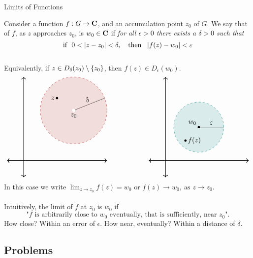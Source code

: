 \vspace*{2em}

\begin{mdframed}
\begin{center}
{\Large Limits of Functions}
\end{center}
\end{mdframed}

\begin{definition}\label{limdef}
Consider a function $f:G \to \mathbf C$, and an accumulation point $z_0$ of $G$. We say that  of $f$, as $z$ approaches $z_0$, is $w_0 \in \mathbf C$ if \emph{for all $\epsilon > 0$ there exists a $\delta > 0$ such that
\[\text{if }\ 0 < \left\lvert z - z_0\right\rvert < \delta,\quad \text{then }\ \left\lvert f(z) - w_0\right\rvert<\varepsilon\]}\\
Equivalently, if $z \in D_{\delta}(z_0)\setminus \left\{z_0\right\}$, then $f(z) \in D_\epsilon(w_0)$.
\newpage
\[\begin{tikzpicture}[scale=0.85]
    \draw[<->,thick] (-1,0)--(5,0);
	\draw[<->,thick] (0,-1)--(0,5);
	\filldraw[firebrick,fill opacity=1/7,dashed](3,3) circle (2);
    \draw[firebrick,dotted](3,3) circle (3pt);    
    \draw[](3,3)--(4.86,3.735) node[sloped,midway,above]{$\delta$};
    \fill[white] (3,3) circle (3pt) node[below,yshift=-1pt]{\color{black}$z_0$};
    \fill (2,3.735) circle (2pt) node[left]{$z$};
  \end{tikzpicture}
  \qquad\qquad\qquad
  \begin{tikzpicture}[scale=0.85]
    \draw[<->,thick] (-1,0)--(5,0);
	\draw[<->,thick] (0,-1)--(0,5);
	\filldraw[teal,fill opacity=1/7,dashed](2,2) circle (1.5);
    \draw[](2,2)--(3.5,2) node[sloped,midway,above]{$\epsilon$};
    \fill (2,2) circle (2pt) node[above left]{$w_0$};
    \fill (1.2,1.2) circle (2pt) node[right]{$f(z)$};
  \end{tikzpicture}\]
In this case we write $\lim_{z \to z_0}f(z) = w_0$ or $f(z) \to w_0,\ \text{as } z \to z_0$.\\
\\
Intuitively, the limit of $f$ at $z_0$ is $w_0$ if \[\text{"$f$ is arbitrarily close to $w_0$ eventually, that is sufficiently, near $z_0$".}\] How close? Within an error of $\epsilon$. How near, eventually? Within a distance of $\delta$.
\end{definition}

\vspace*{2em}

\subsection{Problems}
\vspace{0.1in}

